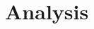 \documentclass[a4paper,12pt]{article}
\begin{document}
 \section{Analysis}

 

 

 
 
 
 
 

\end{document}
